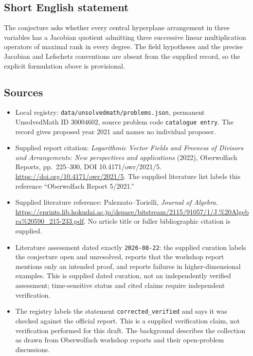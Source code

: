 \documentclass[11pt]{article}
\begin{document}
\subsection{Short English statement}
The conjecture asks whether every central hyperplane arrangement in three variables has a Jacobian quotient admitting three successive linear multiplication operators of maximal rank in every degree. The field hypotheses and the precise Jacobian and Lefschetz conventions are absent from the supplied record, so the explicit formulation above is provisional.
\subsection{Sources}
\begin{itemize}
\item Local registry: \texttt{data/unsolvedmath/problems.json}, permanent UnsolvedMath ID \(30004602\), source problem code \texttt{catalogue entry}. The record gives proposed year 2021 and names no individual proposer.
\item Supplied report citation: \emph{Logarithmic Vector Fields and Freeness of Divisors and Arrangements: New perspectives and applications} (2022), Oberwolfach Reports, pp.\ 225--300, DOI 10.4171/owr/2021/5. \url{https://doi.org/10.4171/owr/2021/5}. The supplied literature list labels this reference ``Oberwolfach Report 5/2021.''
\item Supplied literature reference: Palezzato--Torielli, \emph{Journal of Algebra}. \url{https://eprints.lib.hokudai.ac.jp/dspace/bitstream/2115/91057/1/J.%20Algebra%20590_215-233.pdf}. No article title or fuller bibliographic citation is supplied.
\item Literature assessment dated exactly \texttt{2026-08-22}: the supplied curation labels the conjecture open and unresolved, reports that the workshop report mentions only an intended proof, and reports failures in higher-dimensional examples. This is supplied dated curation, not an independently verified assessment; time-sensitive status and cited claims require independent verification.
\item The registry labels the statement \texttt{corrected\_verified} and says it was checked against the official report. This is a supplied verification claim, not verification performed for this draft. The background describes the collection as drawn from Oberwolfach workshop reports and their open-problem discussions.
\end{itemize}
\end{document}
